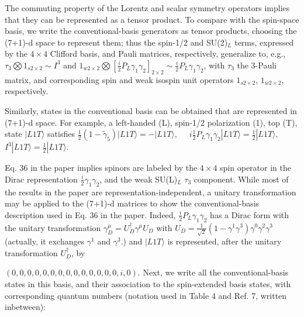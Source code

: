 \documentclass[12pt]{article}
\renewcommand\[{\begin{dmath}}
\renewcommand\]{\end{dmath}}
\begin{document}

  The commuting property of the Lorentz and scalar symmetry operators implies that they can be represented as a tensor product.   To compare with the spin-space basis,
    we write    the conventional-basis generators  as  tensor products,   choosing the (7+1)-d space to represent them;  thus
  the  spin-1/2   and SU(2)$_L$ terms,  expressed by the $4\times4$  Clifford  basis, and Pauli matrices, respectively,  generalize to, e.g.,   $ \tau_3\bigotimes 1_{s 2\times2}\sim I^3 $
  and  $1_{w 2\times2}\bigotimes [  \frac{i}{2}P_L \gamma_1\gamma_2]_{2\times 2}   \sim  \frac{i}{2}P_L \gamma_1\gamma_2 $, with $\tau_3$  the 3-Pauli matrix, and corresponding
  spin and weak isospin unit operators  $1_{s 2\times2}$, $1_{w 2\times2}$, respectively.


Similarly, states in the conventional basis can be obtained that are    represented in (7+1)-d space.
For example,    a left-handed (L),  spin-1/2 polarization (1),   top (T),     state
$ |  L 1  T   \rangle $ satisfies
$\frac{1}{2}(1-\tilde \gamma_5)| L 1 T\rangle = -| L 1 T\rangle  , $  \  \
$ i\frac{1}{2}P_L \gamma_1\gamma_2| L 1 T\rangle  =\frac{1}{2}| L 1 T\rangle, $ \ \
$ I^3| L 1 T\rangle =\frac{1}{2} | L 1 T\rangle $.


Eq. 36 in the paper implies spinors are labeled by the $4\times 4$  spin  operator in the Dirac representation $ \frac{i}{2} \gamma_1\gamma_2 $, and
    the weak SU(L)$_L$ $\tau_3$ component. While most of the results in the paper are representation-independent, a unitary transformation may be applied to the (7+1)-d matrices to show the conventional-basis
description used in Eq. 36 in the paper. Indeed, $    \frac{i}{2}P_L \gamma_1\gamma_2$ has a Dirac   form with the unitary transformation
$\gamma ^\mu_D=U_D^\dagger  \gamma^ \mu   U_D$ with $U_D= \frac{1}{\sqrt{2}}(1-\gamma^1\gamma^3) \gamma^0  \gamma^2 \gamma^ 3 $ (actually, it exchanges $\gamma^1$ and $\gamma^3$.)
and  $ |  L 1 T\rangle $ is represented, after the unitary transformation $U_D^\dagger$,  by

\noindent $ (0, 0, 0, 0, 0, 0, 0, 0, 0, 0, 0, 0, 0, 0, i, 0).$
Next, we write  all the  conventional-basis states  in this basis, and their association to the spin-extended basis states, with corresponding    quantum numbers (notation used  in Table 4 and Ref. 7, written inbetween):
\end{document}
